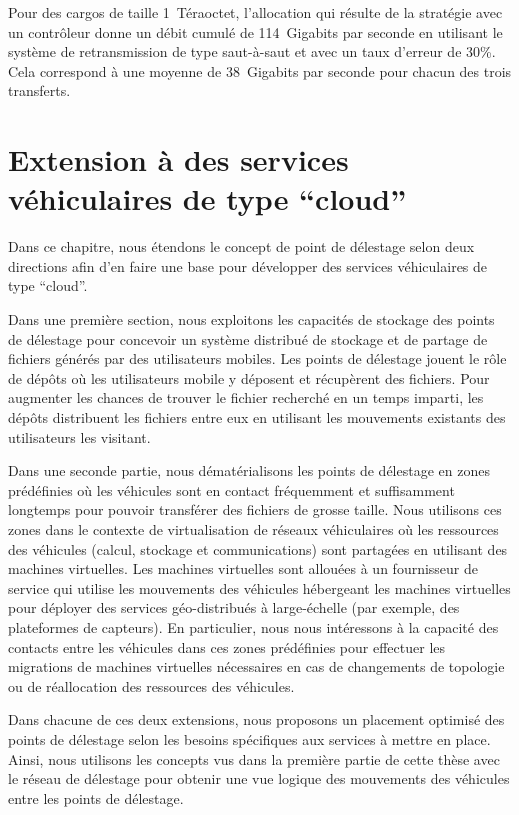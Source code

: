 Pour des cargos de taille 1~Téraoctet, l’allocation qui résulte de la stratégie avec un contrôleur donne un débit cumulé de 114~Gigabits par seconde en utilisant le système de retransmission de type saut-à-saut et avec un taux d’erreur de 30\%. Cela correspond à une moyenne de 38~Gigabits par seconde pour chacun des trois transferts. 
 
\section{Extension à des services véhiculaires de type ``cloud''} 

Dans ce chapitre, nous étendons le concept de point de délestage selon deux directions afin d’en faire une base pour développer des services véhiculaires de type ``cloud''. 
 
Dans une première section, nous exploitons les capacités de stockage des points de délestage pour concevoir un système distribué de stockage et de partage de fichiers générés par des utilisateurs mobiles. Les points de délestage jouent le rôle de dépôts où les utilisateurs mobile y déposent et récupèrent des fichiers. Pour augmenter les chances de trouver le fichier recherché en un temps imparti, les dépôts distribuent les fichiers entre eux en utilisant les mouvements existants des utilisateurs les visitant.
 
Dans une seconde partie, nous dématérialisons les points de délestage en zones prédéfinies où les véhicules sont en contact fréquemment et suffisamment longtemps pour pouvoir transférer des fichiers de grosse taille. Nous utilisons ces zones dans le contexte de virtualisation de réseaux véhiculaires où les ressources des véhicules (\ie calcul, stockage et communications) sont partagées en utilisant des machines virtuelles. Les machines virtuelles sont allouées à un fournisseur de service qui utilise les mouvements des véhicules hébergeant les machines virtuelles pour déployer des services géo-distribués à large-échelle (par exemple, des plateformes de capteurs). En particulier, nous nous intéressons à la capacité des contacts entre les véhicules dans ces zones prédéfinies pour effectuer les migrations de machines virtuelles nécessaires en cas de changements de topologie ou de réallocation des ressources des véhicules.
 
Dans chacune de ces deux extensions, nous proposons un placement optimisé des points de délestage selon les besoins spécifiques aux services à mettre en place. Ainsi, nous utilisons les concepts vus dans la première partie de cette thèse avec le réseau de délestage pour obtenir une vue logique des mouvements des véhicules entre les points de délestage. 
 
